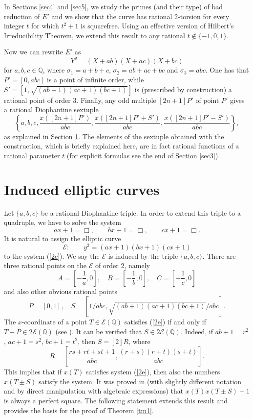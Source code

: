 \documentclass[11pt]{amsart}
\theoremstyle{plain}
\theoremstyle{remark}
\begin{document}
In Sections \ref{sec4} and \ref{sec5}, we study the primes (and their type) of bad reduction of $E'$ and we show that the curve has rational $2$-torsion for every integer $t$ for which $t^2+1$ is squarefree. Using an effective version of Hilbert's Irreducibility Theorem, we extend this result to any rational $t\notin \{-1,0,1\}$.

Now we can rewrite $E'$ as
$$
Y^2=(X+ab)(X+ac)(X+bc)
$$
for $a,b,c\in \mathbb{Q}$, where $\sigma_1=a+b+c$, $\sigma_2=ab+ac+bc$ and $\sigma_3=abc$. One has that $P'=[0,abc]$ is a point of infinite order, while $S'=[1,\sqrt{(ab+1)(ac+1)(bc+1)}]$ is (prescribed by construction) a rational point of order $3$. Finally, any odd multiple $[2n+1]P'$ of point $P'$ gives a rational Diophantine sextuple
$$
\left\{a,b,c,\frac{x([2n+1]P')}{abc},\frac{x([2n+1]P'+S')}{abc}, \frac{x([2n+1]P'-S')}{abc} \right\},
$$
as explained in Section \ref{sec2}. The elements of the sextuple obtained with the construction, which is briefly explained here, are in fact rational functions of a rational parameter $t$ (for explicit formulas see the end of Section \ref{sec3}).

\section{Induced elliptic curves}
\label{sec2}

\noindent Let $\{a,b,c\}$ be a rational Diophantine triple. In order to extend this triple to a quadruple, we have to solve the system \begin{equation}
\label{2e}
ax+1=\Box,\qquad bx+1=\Box,\qquad cx+1=\Box.
\end{equation}
It is natural to assign the elliptic curve
\begin{equation}
\label{3e}
\mathcal{E}: \qquad y^2=(ax+1)(bx+1)(cx+1)
\end{equation}
to the system (\ref{2e}). We say the $\mathcal{E}$ is induced by the triple $\{a,b,c\}$. There are three rational points on the $\mathcal{E}$ of order $2$, namely
$$
A=\left[-\frac{1}{a},0\right],\quad B=\left[-\frac{1}{b},0\right],\quad C=\left[-\frac{1}{c},0\right]
$$
and also other obvious rational points
$$
P=[0,1], \quad S=[1/abc, \sqrt{(ab+1)(ac+1)(bc+1)}/abc ].
$$
The $x$-coordinate of a point $T\in \mathcal{E}(\mathbb{Q})$ satisfies (\ref{2e}) if and only if $T-P\in 2\mathcal{E}(\mathbb{Q})$ (see \cite{D-rim}). It can be verified that $S\in 2\mathcal{E}(\mathbb{Q})$. Indeed, if $ab+1=r^2$, $ac+1=s^2$, $bc+1=t^2$, then $S=[2]R$, where
$$
R=\left[ \frac{rs+rt+st+1}{abc}, \frac{(r+s)(r+t)(s+t)}{abc} \right].
$$
This implies that if $x(T)$ satisfies system (\ref{2e}), then also the numbers $x(T\pm S)$ satisfy the system. It was proved in \cite[Proposition 2]{D-acta2} (with slightly different notation and by direct manipulation with algebraic expressions) that $x(T)x(T\pm S)+1$ is always a perfect square. The following statement extends this result and provides the basis for the proof of Theorem \ref{tm1}.
\end{document}
